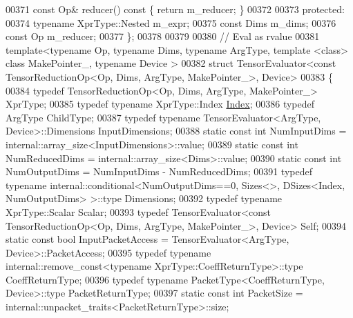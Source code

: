 \begin{DoxyCode}
00371     \textcolor{keyword}{const} Op& reducer()\textcolor{keyword}{ const }\{ \textcolor{keywordflow}{return} m\_reducer; \}
00372 
00373   \textcolor{keyword}{protected}:
00374     \textcolor{keyword}{typename} XprType::Nested m\_expr;
00375     \textcolor{keyword}{const} Dims m\_dims;
00376     \textcolor{keyword}{const} Op m\_reducer;
00377 \};
00378 
00379 
00380 \textcolor{comment}{// Eval as rvalue}
00381 \textcolor{keyword}{template}<\textcolor{keyword}{typename} Op, \textcolor{keyword}{typename} Dims, \textcolor{keyword}{typename} ArgType, \textcolor{keyword}{template} <\textcolor{keyword}{class}> \textcolor{keyword}{class }MakePointer\_, \textcolor{keyword}{typename} Device
      >
00382 \textcolor{keyword}{struct }TensorEvaluator<const TensorReductionOp<Op, Dims, ArgType, MakePointer\_>, Device>
00383 \{
00384   \textcolor{keyword}{typedef} TensorReductionOp<Op, Dims, ArgType, MakePointer\_> XprType;
00385   \textcolor{keyword}{typedef} \textcolor{keyword}{typename} XprType::Index \hyperlink{namespace_eigen_a62e77e0933482dafde8fe197d9a2cfde}{Index};
00386   \textcolor{keyword}{typedef} ArgType ChildType;
00387   \textcolor{keyword}{typedef} \textcolor{keyword}{typename} TensorEvaluator<ArgType, Device>::Dimensions InputDimensions;
00388   \textcolor{keyword}{static} \textcolor{keyword}{const} \textcolor{keywordtype}{int} NumInputDims = internal::array\_size<InputDimensions>::value;
00389   \textcolor{keyword}{static} \textcolor{keyword}{const} \textcolor{keywordtype}{int} NumReducedDims = internal::array\_size<Dims>::value;
00390   \textcolor{keyword}{static} \textcolor{keyword}{const} \textcolor{keywordtype}{int} NumOutputDims = NumInputDims - NumReducedDims;
00391   \textcolor{keyword}{typedef} \textcolor{keyword}{typename} internal::conditional<NumOutputDims==0, Sizes<>, DSizes<Index, NumOutputDims> >::type 
      Dimensions;
00392   \textcolor{keyword}{typedef} \textcolor{keyword}{typename} XprType::Scalar Scalar;
00393   \textcolor{keyword}{typedef} TensorEvaluator<const TensorReductionOp<Op, Dims, ArgType, MakePointer\_>, Device> Self;
00394   \textcolor{keyword}{static} \textcolor{keyword}{const} \textcolor{keywordtype}{bool} InputPacketAccess = TensorEvaluator<ArgType, Device>::PacketAccess;
00395   \textcolor{keyword}{typedef} \textcolor{keyword}{typename} internal::remove\_const<typename XprType::CoeffReturnType>::type CoeffReturnType;
00396   \textcolor{keyword}{typedef} \textcolor{keyword}{typename} PacketType<CoeffReturnType, Device>::type PacketReturnType;
00397   \textcolor{keyword}{static} \textcolor{keyword}{const} \textcolor{keywordtype}{int} PacketSize = internal::unpacket\_traits<PacketReturnType>::size;

\end{DoxyCode}
